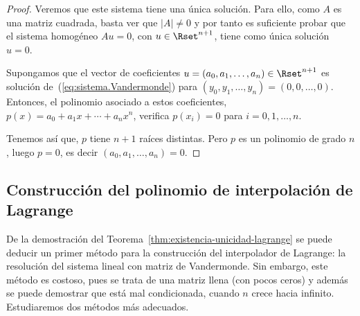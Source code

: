 \begin{proof}
    Veremos que
  este sistema tiene una única solución. Para ello, como $A$ es una
  matriz cuadrada, basta ver que $|A|\neq 0$ y por tanto es suficiente
  probar que el sistema homogéneo $Au=0$, con $u\in\Rset^{n+1}$, tiene
  como única solución $u=0$.

  Supongamos que el vector de coeficientes
  $u=(a_0,a_1,\dots,a_n) \in\Rset^{n+1}$ es solución
  de~(\ref{eq:sistema.Vandermonde}) para
  $(y_0,y_1,\dots,y_n)=(0,0,\dots,0)$. Entonces, el polinomio
  asociado a estos coeficientes,
  $p(x)=a_0 + a_1x + \cdots + a_n x^n$, verifica $p(x_i)=0$ para
  $i=0,1,\dots,n$.

  Tenemos así que, $p$ tiene $n+1$ raíces distintas. Pero
  $p$ es un polinomio de grado $n$, luego $p=0$, es decir
  $(a_0,a_1,\dots,a_n)=0$.
\end{proof}


\subsection{Construcción del polinomio de interpolación de Lagrange}
\label{sec:construcion--polinomio-lagrange}

De la demostración del Teorema~\ref{thm:existencia-unicidad-lagrange}
se puede deducir un primer método para la construcción del
interpolador de Lagrange: la resolución del sistema lineal con matriz
de Vandermonde. Sin embargo, este método es costoso, pues se trata de
una matriz llena (con pocos ceros) y además se puede demostrar que
está mal condicionada, cuando $n$ crece hacia infinito. Estudiaremos
dos métodos más adecuados.

